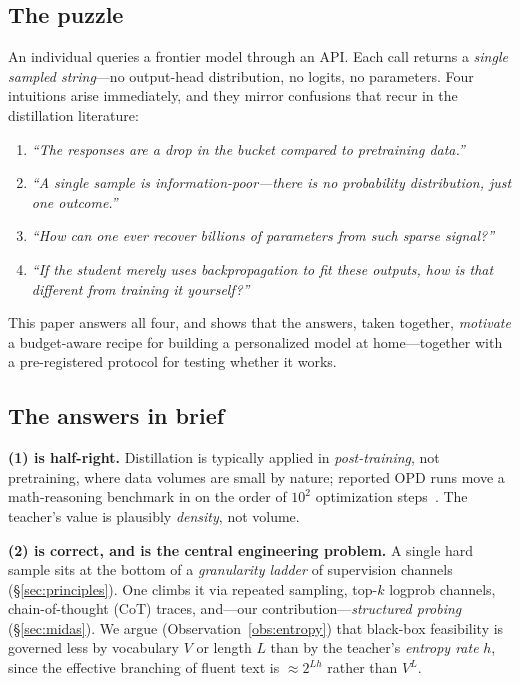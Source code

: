 \documentclass[11pt]{article}
\begin{document}
\subsection{The puzzle}
An individual queries a frontier model through an API. Each call returns a \emph{single sampled string}---no output-head distribution, no logits, no parameters. Four intuitions arise immediately, and they mirror confusions that recur in the distillation literature:
\begin{enumerate}
  \item \emph{``The responses are a drop in the bucket compared to pretraining data.''}
  \item \emph{``A single sample is information-poor---there is no probability distribution, just one outcome.''}
  \item \emph{``How can one ever recover billions of parameters from such sparse signal?''}
  \item \emph{``If the student merely uses backpropagation to fit these outputs, how is that different from training it yourself?''}
\end{enumerate}
This paper answers all four, and shows that the answers, taken together, \emph{motivate} a budget-aware recipe for building a personalized model at home---together with a pre-registered protocol for testing whether it works.

\subsection{The answers in brief}
\textbf{(1) is half-right.} Distillation is typically applied in \emph{post-training}, not pretraining, where data volumes are small by nature; reported OPD runs move a math-reasoning benchmark in on the order of $10^2$ optimization steps~\cite{lu2025opd,qwen3}. The teacher's value is plausibly \emph{density}, not volume.

\textbf{(2) is correct, and is the central engineering problem.} A single hard sample sits at the bottom of a \emph{granularity ladder} of supervision channels (\S\ref{sec:principles}). One climbs it via repeated sampling, top-$k$ logprob channels, chain-of-thought (CoT) traces, and---our contribution---\emph{structured probing} (\S\ref{sec:midas}). We argue (Observation~\ref{obs:entropy}) that black-box feasibility is governed less by vocabulary $V$ or length $L$ than by the teacher's \emph{entropy rate} $h$, since the effective branching of fluent text is $\approx 2^{Lh}$ rather than $V^L$.
\end{document}
